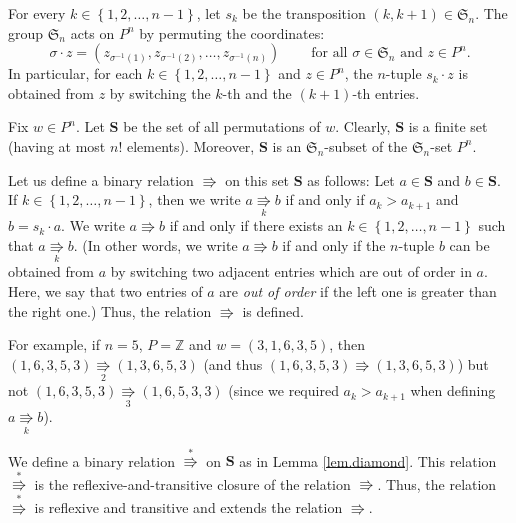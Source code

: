 \documentclass[numbers=enddot,12pt,final,onecolumn,notitlepage]{scrartcl}%
\theoremstyle{definition}
\begin{document}
For every $k\in\left\{  1,2,\ldots,n-1\right\}  $, let $s_{k}$ be the
transposition $\left(  k,k+1\right)  \in\mathfrak{S}_{n}$. The group
$\mathfrak{S}_{n}$ acts on $P^{n}$ by permuting the coordinates:%
\[
\sigma\cdot z=\left(  z_{\sigma^{-1}\left(  1\right)  },z_{\sigma^{-1}\left(
2\right)  },\ldots,z_{\sigma^{-1}\left(  n\right)  }\right)
\ \ \ \ \ \ \ \ \ \ \text{for all }\sigma\in\mathfrak{S}_{n}\text{ and }z\in
P^{n}.
\]
In particular, for each $k\in\left\{  1,2,\ldots,n-1\right\}  $ and $z\in
P^{n}$, the $n$-tuple $s_{k}\cdot z$ is obtained from $z$ by switching the
$k$-th and the $\left(  k+1\right)  $-th entries.

Fix $w\in P^{n}$. Let $\mathbf{S}$ be the set of all permutations of $w$.
Clearly, $\mathbf{S}$ is a finite set (having at most $n!$ elements).
Moreover, $\mathbf{S}$ is an $\mathfrak{S}_{n}$-subset of the $\mathfrak{S}%
_{n}$-set $P^{n}$.

Let us define a binary relation $\Rrightarrow$ on this set $\mathbf{S}$ as
follows: Let $a\in\mathbf{S}$ and $b\in\mathbf{S}$. If $k\in\left\{
1,2,\ldots,n-1\right\}  $, then we write $a\underset{k}{\Rrightarrow}b$ if and
only if $a_{k}>a_{k+1}$ and $b=s_{k}\cdot a$. We write $a\Rrightarrow b$ if
and only if there exists an $k\in\left\{  1,2,\ldots,n-1\right\}  $ such that
$a\underset{k}{\Rrightarrow}b$. (In other words, we write $a\Rrightarrow b$ if
and only if the $n$-tuple $b$ can be obtained from $a$ by switching two
adjacent entries which are out of order in $a$. Here, we say that two entries
of $a$ are \textit{out of order} if the left one is greater than the right
one.) Thus, the relation $\Rrightarrow$ is defined.

For example, if $n=5$, $P=\mathbb{Z}$ and $w=\left(  3,1,6,3,5\right)  $, then
$\left(  1,6,3,5,3\right)  \underset{2}{\Rrightarrow}\left(  1,3,6,5,3\right)
$ (and thus $\left(  1,6,3,5,3\right)  \Rrightarrow\left(  1,3,6,5,3\right)
$) but not $\left(  1,6,3,5,3\right)  \underset{3}{\Rrightarrow}\left(
1,6,5,3,3\right)  $ (since we required $a_{k}>a_{k+1}$ when defining
$a\underset{k}{\Rrightarrow}b$).

We define a binary relation $\overset{\ast}{\Rrightarrow}$ on $\mathbf{S}$ as
in Lemma \ref{lem.diamond}. This relation $\overset{\ast}{\Rrightarrow}$ is
the reflexive-and-transitive closure of the relation $\Rrightarrow$. Thus, the
relation $\overset{\ast}{\Rrightarrow}$ is reflexive and transitive and
extends the relation $\Rrightarrow$.
\end{document}
